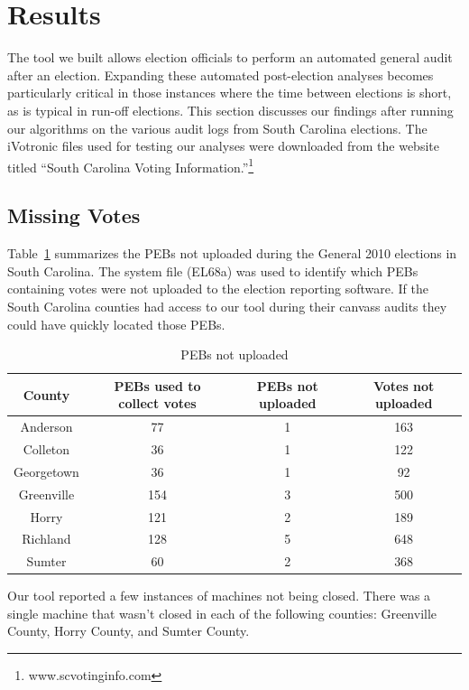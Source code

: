 \section{Results}
The tool we built allows election officials to perform an automated general audit after an election.  Expanding these automated post-election analyses becomes particularly critical in those instances where the time between elections is short, as is typical in run-off elections.  This section discusses our findings after running our algorithms on the various audit logs from South Carolina elections.  The iVotronic files used for testing our analyses were downloaded from the website titled \textquotedblleft South Carolina Voting Information.\textquotedblright \footnote{www.scvotinginfo.com}

\subsection{Missing Votes}
Table~\ref{tab:pebs} summarizes the PEBs not uploaded during the General 2010 elections in South Carolina. The system file (EL68a) was used to identify which PEBs containing votes were not uploaded to the election reporting software. If the South Carolina counties had access to our tool during their canvass audits they could have quickly located those PEBs.

\begin{table}
    \begin{center}
    \begin{tabular}{| c | c | c | c |}
    \hline                   
    County &PEBs used to collect votes &PEBs not uploaded &Votes not uploaded\\
    \hline
    Anderson &77 &1 &163\\
    \hline
    Colleton &36 &1 &122\\
    \hline
    Georgetown &36 &1 &92\\
    \hline
    Greenville &154 &3 &500\\
    \hline
    Horry &121 &2 &189\\
    \hline
    Richland &128 &5 &648\\
    \hline
    Sumter &60 &2 &368\\
    \hline
    \end{tabular}
    \end{center}
    \caption{PEBs not uploaded}
    \label{tab:pebs}
\end{table}

Our tool reported a few instances of machines not being closed.  There was a single machine that wasn't closed in each of the following counties: Greenville County, Horry County, and Sumter County.  

